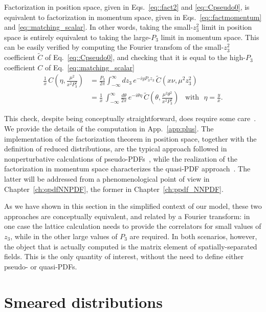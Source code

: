 Factorization in position space, given in Eqs.~\eqref{eq::fact2} and
\eqref{eq::Cpseudo0}, is equivalent to factorization in momentum space, given in
Eqs.~\eqref{eq::factmomentum} and \eqref{eq::matching_scalar}. In other words, taking
the small-$z_3^2$ limit in position space is entirely equivalent to taking the
large-$P_3$ limit in momentum space. This can be easily verified by computing
the Fourier transfom of the small-$z_3^2$ coefficient $\tilde{C}$ of
Eq.~\eqref{eq::Cpseudo0}, and checking that it is equal to the high-$P_3$
coefficient $C$ of Eq.~\eqref{eq::matching_scalar} 
\begin{align}
	\label{eq::check}
	\frac{1}{x}\,C\left(\eta,\frac{\mu^2}{x^2 P_3^2}\right) &= 
	\frac{P_3}{2\pi}\int_{-\infty}^{\infty} dz_3\, e^{-i y P_3 z_3 }\,
	\tilde{C}\left(x\nu, \mu^2 z_3^2 \right) \nonumber \\
	&= \frac{1}{x}\,\int_{-\infty}^{\infty}\frac{d\theta}{2\pi}\, e^{-i\theta\eta}\,
	\tilde{C}\left(\theta, \frac{\mu^2\theta^2}{x^2 P_3^2} \right)\,\,\,\,\, \text{with}\,\,\,\, \eta = \frac{y}{x}.
\end{align}

This check, despite being conceptually straightforward, does require some
care~\cite{Izubuchi:2018srq}. We provide the details of the computation in
App.~\ref{app:plus}.
%
The implementation of the factorization theorem in position space, together with
the definition of reduced distributions, are the typical approach followed in nonperturbative calculations of
pseudo-PDFs~\cite{Radyushkin:2017cyf,Orginos:2017kos,Joo:2019jct,Joo:2019bzr,Joo:2020spy,
Radyushkin:2019owq}, while the realization of the factorization in momentum
space characterizes the quasi-PDF
approach~\cite{PhysRevLett.110.262002,Alexandrou:2018pbm, Alexandrou:2019lfo,
Chai:2020nxw, Bhat:2020ktg}. The latter will be addressed from a phenomenological point of 
view in Chapter~\ref{ch:qpdfNNPDF}, the former in Chapter~\ref{ch:ppdf_NNPDF}.

As we have shown in this section in the simplified context of our model, these
two approaches are conceptually equivalent, and related by a Fourier transform:
in one case the lattice calculation needs to provide the correlators for  small
values of $z_3$, while in the other large values of $P_3$ are required. In both
scenarios, however, the object that is actually computed is the matrix element
of spatially-separated fields. This is the only quantity of interest, without
the need to define either pseudo- or quasi-PDFs.

\section{Smeared distributions}
\label{sec:flow}

